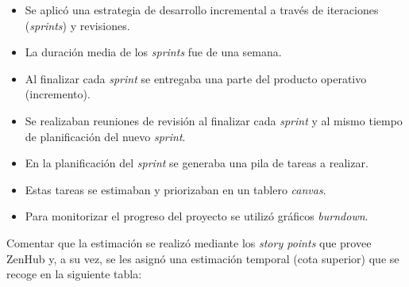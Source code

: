\begin{itemize}
\tightlist
\item
  Se aplicó una estrategia de desarrollo incremental a través de
  iteraciones (\emph{sprints}) y revisiones.
\item
  La duración media de los \emph{sprints} fue de una semana.
\item
  Al finalizar cada \emph{sprint} se entregaba una parte del producto
  operativo (incremento).
\item
  Se realizaban reuniones de revisión al finalizar cada \emph{sprint} y
  al mismo tiempo de planificación del nuevo \emph{sprint}.
\item
  En la planificación del \emph{sprint} se generaba una pila de tareas a
  realizar.
\item
  Estas tareas se estimaban y priorizaban en un tablero \emph{canvas}.
\item
  Para monitorizar el progreso del proyecto se utilizó gráficos
  \emph{burndown}.
\end{itemize}

Comentar que la estimación se realizó mediante los \emph{story points}
que provee ZenHub y, a su vez, se les asignó una estimación temporal
(cota superior) que se recoge en la siguiente tabla:

